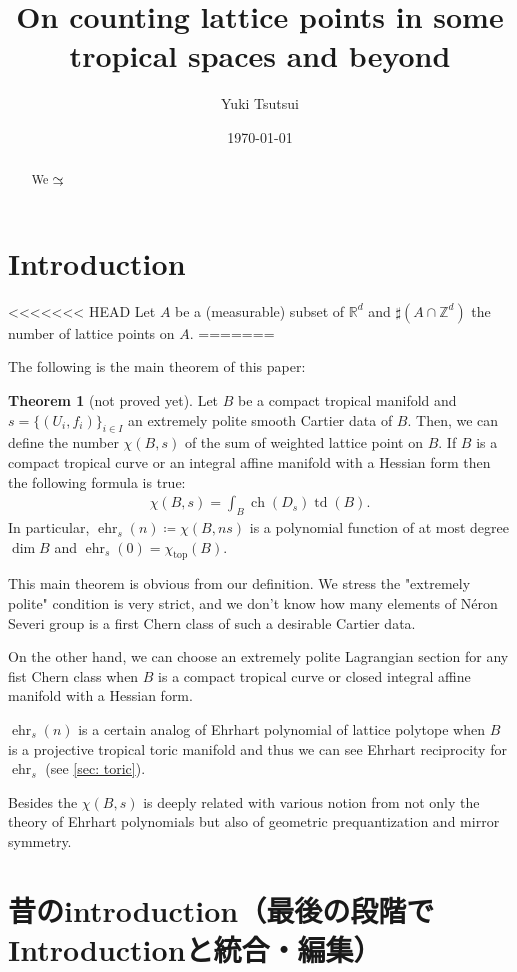 \documentclass[a4paper,dvipdfmx,reqno,12pt]{amsart}
\title{On counting lattice points in some tropical spaces and beyond
}
\author[Y. Tsutsui]{Yuki Tsutsui}
\date{\today}
\theoremstyle{definition}
\newtheorem{Thm}{Theorem}[section]
\newcommand{\deq}{\coloneqq}
\newcommand{\R}{\mathbb{R}}%
\newcommand{\Z}{\mathbb{Z}}%
\newcommand{\opn}[1]{\operatorname{#1}}
\newcommand{\simto}{ 
\mathrel{\raisebox{0.13em}{${\sim}$}}
\kern -0.75em \mathrel{\raisebox{-0.11em}{${\scriptstyle \to}$}}  
}
\numberwithin{equation}{section}
\begin{document}
\begin{abstract}
  We $\simto$
\end{abstract}
\maketitle

\section{Introduction}
<<<<<<< HEAD
Let $A$ be a (measurable) subset of $\R^{d}$ and $\sharp (A\cap \Z^{d})$ the number of lattice points on $A$.
=======

The following is the main theorem of this paper:

\begin{Thm}[not proved yet]
  Let $B$ be a compact tropical manifold and $s=\{(U_i,f_i)\}_{i\in I}$ an extremely polite smooth Cartier data of $B$.
  Then, we can define the number $\chi(B,s)$ of the sum of
  weighted lattice point on $B$.
  If $B$ is a compact tropical curve or an integral affine manifold with
  a Hessian form then the following formula is true:
  \begin{align}
    \chi(B,s)=\int_{B} \opn{ch}(D_s)\opn{td}(B).
  \end{align}
  In particular, $\opn{ehr}_{s}(n)\deq \chi(B,ns)$ is a polynomial function of at most degree $\opn{dim} B$ and $\opn{ehr}_{s}(0)=\chi_{\opn{top}}(B)$.
\end{Thm}
This main theorem is obvious from our definition.
We stress the "extremely polite" condition is very strict,
and we don't know how many elements of N\'eron Severi group
is a first Chern class of such a desirable Cartier data.

On the other hand, we can choose an extremely polite Lagrangian section
for any fist Chern class when $B$ is a compact tropical curve or closed integral affine
manifold with a Hessian form.

$\opn{ehr}_{s}(n)$ is a certain analog of Ehrhart polynomial of lattice polytope when $B$ is a projective tropical toric manifold and thus we can see Ehrhart reciprocity for $\opn{ehr}_s$ (see \cref{sec: toric}).

Besides the $\chi(B,s)$ is deeply related with various notion from not only the theory of Ehrhart polynomials but also of geometric prequantization and mirror symmetry.

\section{昔のintroduction（最後の段階でIntroductionと統合・編集）}
\end{document}
